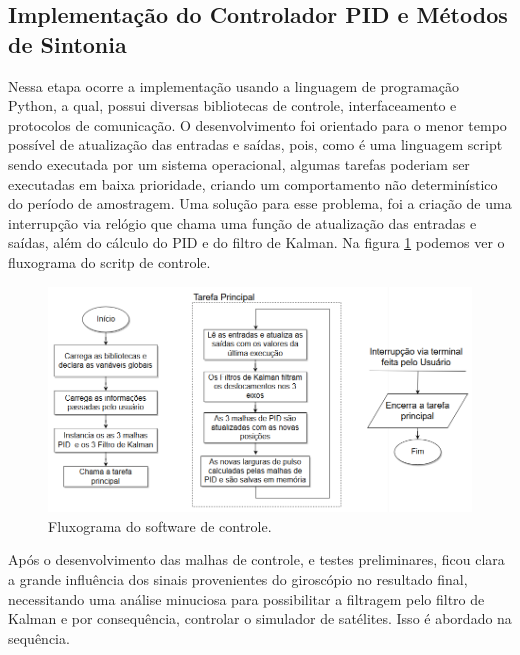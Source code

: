 
\subsection{Implementação do Controlador PID e Métodos de Sintonia}

Nessa etapa ocorre a implementação usando a linguagem de programação Python, a qual, possui diversas bibliotecas de controle, interfaceamento e protocolos de comunicação. O desenvolvimento foi orientado para o menor tempo possível de atualização das entradas e saídas, pois, como é uma linguagem script sendo executada por um sistema operacional, algumas tarefas poderiam ser executadas em baixa prioridade, criando um comportamento não determinístico do período de amostragem. Uma solução para esse problema, foi a criação de uma interrupção via relógio que chama uma função de atualização das entradas e saídas, além do cálculo do PID e do filtro de Kalman. Na figura \ref{fig:software_model} podemos ver o fluxograma do scritp de controle.

\begin{figure}[H]
  \caption{Fluxograma do software de controle.}
  \begin{center}
      \includegraphics[scale=.65]{metodologia/img/software_model}
  \end{center}
  \label{fig:software_model}
\end{figure}

Após o desenvolvimento das malhas de controle, e testes preliminares, ficou clara a grande influência dos sinais provenientes do giroscópio no resultado final, necessitando uma análise minuciosa para possibilitar a filtragem pelo filtro de Kalman e por consequência, controlar o simulador de satélites. Isso é abordado na sequência. 


